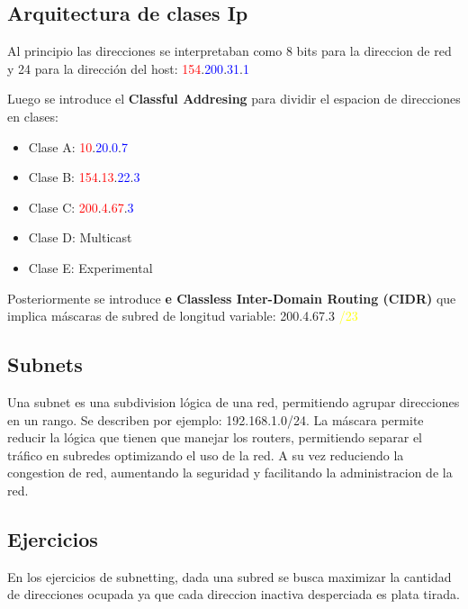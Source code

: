 \subsection{Arquitectura de clases Ip}

Al principio las direcciones se interpretaban como 8 bits para la direccion de red y 24 para la dirección del host: \textcolor{red}{154}.\textcolor{blue}{200}.\textcolor{blue}{31}.\textcolor{blue}{1}

Luego se introduce el \textbf{Classful  Addresing} para dividir el espacion de direcciones en clases:

\begin{itemize}
    \item Clase A: \textcolor{red}{10}.\textcolor{blue}{20}.\textcolor{blue}{0}.\textcolor{blue}{7}
    \item Clase B: \textcolor{red}{154}.\textcolor{red}{13}.\textcolor{blue}{22}.\textcolor{blue}{3}
    \item Clase C: \textcolor{red}{200}.\textcolor{red}{4}.\textcolor{red}{67}.\textcolor{blue}{3}
    \item Clase D: Multicast
    \item Clase E: Experimental
\end{itemize}

Posteriormente se introduce \textbf{e Classless Inter-Domain Routing (CIDR)} que implica máscaras de subred de longitud variable: 200.4.67.3 \textcolor{yellow}{/23}

\subsection{Subnets}

Una subnet es una subdivision lógica de una red, permitiendo agrupar direcciones en un rango. Se describen por ejemplo: 192.168.1.0/24.
La máscara permite reducir la lógica que tienen que manejar los routers, permitiendo separar el tráfico en subredes optimizando el uso de la red. A su vez reduciendo la congestion de red, aumentando la seguridad y facilitando la administracion de la red.

\subsection{Ejercicios}

En los ejercicios de subnetting, dada una subred se busca maximizar la cantidad de direcciones ocupada ya que cada direccion inactiva desperciada es plata tirada.

